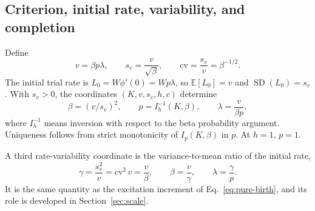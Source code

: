 \documentclass[12pt]{article}
\newcommand{\E}{\mathbb{E}}
\theoremstyle{definition}
\theoremstyle{plain}
\theoremstyle{remark}
\begin{document}
\subsection{Criterion, initial rate, variability, and completion}
Define
\begin{equation}
 v=\beta p\lambda,\qquad s_v=\frac{v}{\sqrt\beta},\qquad
 \mathrm{cv}=\frac{s_v}{v}=\beta^{-1/2}.\label{eq:coordinates}
\end{equation}
The initial trial rate is $L_0=W\phi'(0)=Wp\lambda$, so $\E[L_0]=v$ and $\operatorname{SD}(L_0)=s_v$. With $s_v>0$, the coordinates $(K,v,s_v,h,c)$ determine
\begin{equation}
 \beta=(v/s_v)^2,\qquad p=I^{-1}_{h}(K,\beta),\qquad
 \lambda=\frac{v}{\beta p},\label{eq:inverse-chart}
\end{equation}
where $I^{-1}_{h}$ means inversion with respect to the beta probability argument. Uniqueness follows from strict monotonicity of $I_p(K,\beta)$ in $p$. At $h=1$, $p=1$.

A third rate-variability coordinate is the variance-to-mean ratio of the initial rate,
\begin{equation}
 \gamma=\frac{s_v^2}{v}=\mathrm{cv}^2\,v=\frac v\beta,\qquad
 \beta=\frac v\gamma,\qquad \lambda=\frac\gamma p.\label{eq:gamma-coordinate}
\end{equation}
It is the same quantity as the excitation increment of Eq.~\eqref{eq:pure-birth}, and its role is developed in Section~\ref{sec:scale}.
\end{document}

